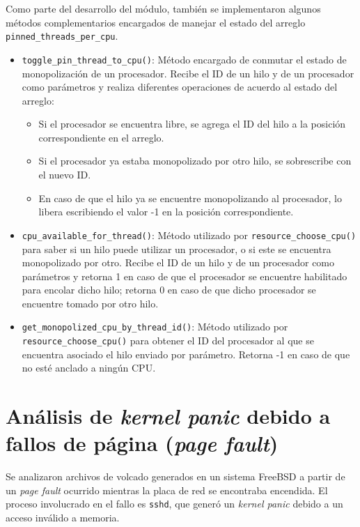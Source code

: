 Como parte del desarrollo del módulo, también se implementaron algunos métodos complementarios encargados de manejar el estado del arreglo \verb|pinned_threads_per_cpu|.

\begin{itemize}
    \item \verb|toggle_pin_thread_to_cpu()|: Método encargado de conmutar el estado de monopolización de un procesador. Recibe el ID de un hilo y de un procesador como parámetros y realiza diferentes operaciones de acuerdo al estado del arreglo:
          \begin{itemize}
              \item Si el procesador se encuentra libre, se agrega el ID del hilo a la posición correspondiente en el arreglo.
              \item Si el procesador ya estaba monopolizado por otro hilo, se sobrescribe con el nuevo ID.
              \item En caso de que el hilo ya se encuentre monopolizando al procesador, lo libera escribiendo el valor -1 en la posición correspondiente.
          \end{itemize}
    \item \verb|cpu_available_for_thread()|: Método utilizado por \verb|resource_choose_cpu()| para saber si un hilo puede utilizar un procesador, o si este se encuentra monopolizado por otro. Recibe el ID de un hilo y de un procesador como parámetros y retorna 1 en caso de que el procesador se encuentre habilitado para encolar dicho hilo; retorna 0 en caso de que dicho procesador se encuentre tomado por otro hilo.
    \item \verb|get_monopolized_cpu_by_thread_id()|: Método utilizado por \verb|resource_choose_cpu()| para obtener el ID del procesador al que se encuentra asociado el hilo enviado por parámetro. Retorna -1 en caso de que no esté anclado a ningún CPU.\par
\end{itemize}

\chapter{Análisis de \textit{kernel panic} debido a fallos de página (\textit{page fault})}\label{appendix:apC}

Se analizaron archivos de volcado generados en un sistema FreeBSD a partir de un \textit{page fault} ocurrido mientras la placa de red se encontraba encendida. El proceso involucrado en el fallo es \texttt{sshd}, que generó un \textit{kernel panic} debido a un acceso inválido a memoria.

